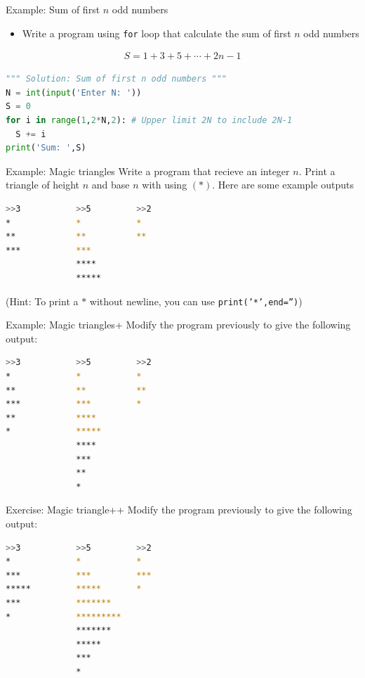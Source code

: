\documentclass[10pt,xcolor={table,dvipsnames},t]{beamer}
\begin{document}
\begin{frame}[fragile]{Example: Sum of first $n$ odd numbers}
  \begin{itemize}
    \item Write a program using \texttt{for} loop that calculate the sum of first $n$ odd numbers
  \end{itemize}
  \begin{align*}
    S = 1 + 3 + 5 + \cdots + 2n-1
  \end{align*}
\begin{lstlisting}[language=python]
""" Solution: Sum of first n odd numbers """
N = int(input('Enter N: '))
S = 0
for i in range(1,2*N,2): # Upper limit 2N to include 2N-1
  S += i
print('Sum: ',S)
\end{lstlisting}
\end{frame}

\begin{frame}[fragile]{Example: Magic triangles}
  Write a program that recieve an integer $n$. Print a triangle of height $n$ and base $n$ with using $(*)$. Here are some example outputs
\begin{lstlisting}[language=bash]
>>3           >>5         >>2
*             *           *
**            **          **
***           ***
              ****
              *****
\end{lstlisting}
(Hint: To print a $*$ without newline, you can use \texttt{print('*',end='')})
\end{frame}

\begin{frame}[fragile]{Example: Magic triangles+}
Modify the program previously to give the following output:
\begin{lstlisting}[language=bash]
>>3           >>5         >>2
*             *           *
**            **          **
***           ***         *
**            ****
*             *****
              ****
              ***
              ** 
              *
\end{lstlisting}
\end{frame}

\begin{frame}[fragile]{Exercise: Magic triangle++}
Modify the program previously to give the following output:
\begin{lstlisting}[language=bash]
>>3           >>5         >>2
*             *           *
***           ***         ***
*****         *****       *
***           *******
*             *********
              *******
              *****
              *** 
              *
\end{lstlisting}
\end{frame}
\end{document}
